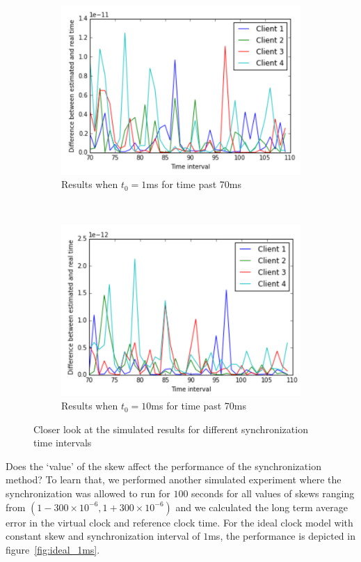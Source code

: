 \documentclass[10pt, journal, letter, onecolumn]{IEEEtran}
\begin{document}
\begin{figure}
\begin{subfigure}[b]{0.48\textwidth}
\centering
\includegraphics[scale=0.5]{figures/figure5}
\caption{Results when $t_0 = 1$ms for time past 70ms}
\label{fig:results2_1ms}
\end{subfigure}~
\begin{subfigure}[b]{0.48\textwidth}
\centering
\includegraphics[scale=0.5]{figures/figure6}
\caption{Results when $t_0 = 10$ms for time past 70ms}
\label{fig:results2_10ms}
\end{subfigure}
\caption{Closer look at the simulated results for different synchronization time intervals}
\label{fig:results2}
\end{figure}

Does the `value' of the skew affect the performance of the synchronization method? To learn that, we performed another simulated experiment where the synchronization was allowed to run for $100$ seconds for all values of skews ranging from $\left(1 - 300\times 10^{-6}, 1 + 300 \times 10^{-6}\right)$ and we calculated the long term average error in the virtual clock and reference clock time. For the ideal clock model with constant skew and synchronization interval of $1$ms, the performance is depicted in figure~\ref{fig:ideal_1ms}.
\end{document}
